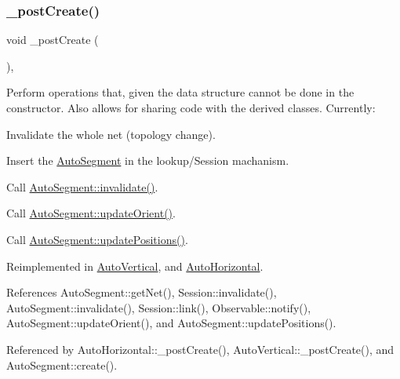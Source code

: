 \subsubsection{\texorpdfstring{\+\_\+post\+Create()}{\_postCreate()}}
{\footnotesize\ttfamily void \+\_\+post\+Create (\begin{DoxyParamCaption}{ }\end{DoxyParamCaption})\hspace{0.3cm}{\ttfamily [protected]}, {\ttfamily [virtual]}}

Perform operations that, given the data structure cannot be done in the constructor. Also allows for sharing code with the derived classes. Currently\+:
\begin{DoxyItemize}
\item Invalidate the whole net (topology change).
\item Insert the \mbox{\hyperlink{classKatabatic_1_1AutoSegment}{Auto\+Segment}} in the lookup/\+Session machanism.
\item Call \mbox{\hyperlink{classKatabatic_1_1AutoSegment_a23599eee5a07af377fbc8d47cda7e7b0}{Auto\+Segment\+::invalidate()}}.
\item Call \mbox{\hyperlink{classKatabatic_1_1AutoSegment_a102e0f4bbb0386e41be214d15a9e4549}{Auto\+Segment\+::update\+Orient()}}.
\item Call \mbox{\hyperlink{classKatabatic_1_1AutoSegment_a6d95f4de39c13611786c95ddc7b8942e}{Auto\+Segment\+::update\+Positions()}}. 
\end{DoxyItemize}

Reimplemented in \mbox{\hyperlink{classKatabatic_1_1AutoVertical_a3715b38135ca24745f610bebd3407c10}{Auto\+Vertical}}, and \mbox{\hyperlink{classKatabatic_1_1AutoHorizontal_a3715b38135ca24745f610bebd3407c10}{Auto\+Horizontal}}.



References Auto\+Segment\+::get\+Net(), Session\+::invalidate(), Auto\+Segment\+::invalidate(), Session\+::link(), Observable\+::notify(), Auto\+Segment\+::update\+Orient(), and Auto\+Segment\+::update\+Positions().



Referenced by Auto\+Horizontal\+::\+\_\+post\+Create(), Auto\+Vertical\+::\+\_\+post\+Create(), and Auto\+Segment\+::create().

\mbox{\label{classKatabatic_1_1AutoSegment_a7c13d9795eafd477994961f8a0d962d0}} 
